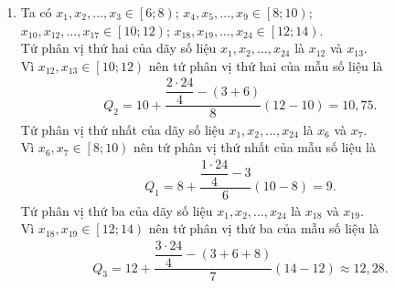 \begin{ex}
{\begin{enumerate}
\begin{longtable}{|*{5}{c|}}
				 \hline
			\end{longtable}
			 \item Ta có $x_1, x_2, \ldots, x_3 \in \left[6; 8\right)$; $x_4, x_5, \ldots, x_9 \in \left[8; 10\right)$; $x_{10}, x_{12}, \ldots, x_{17} \in \left[10; 12\right)$; $x_{18}, x_{19}, \ldots, x_{24} \in \left[12; 14\right)$.\\
			Tứ phân vị thứ hai của dãy số liệu $x_1, x_2, \ldots, x_{24}$ là $x_{12}$ và  $x_{13}$.\\
			Vì $x_{12}, x_{13} \in \left[10; 12\right)$  nên tứ phân vị thứ hai của mẫu số liệu là
			\begin{align*}
				 Q_2=10+\dfrac{\dfrac{2\cdot24}{4}-\left(3+6\right)}{8} \left(12-10\right)=10{,}75.
			\end{align*}
			Tứ phân vị thứ nhất của dãy số liệu $x_1, x_2, \ldots, x_{24}$  là $x_6$ và $x_7$. \\
			Vì $x_6, x_7 \in \left[8; 10\right)$ nên tứ phân vị thứ  nhất của mẫu số liệu là
			\begin{align*}
				Q_1=8+\dfrac{\dfrac{1\cdot24}{4}-3}{6}  \left(10-8\right)=9.
			\end{align*}
			Tứ phân vị thứ ba của dãy số liệu  $x_1, x_2, \ldots, x_{24}$ là $x_{18}$ và $x_{19}$.\\
			Vì $x_{18}, x_{19} \in \left[12; 14\right)$ nên tứ phân  vị thứ ba của mẫu số liệu là
			\begin{align*}
				 Q_3=12+\dfrac{\dfrac{3\cdot24}{4}-\left(3+6+8\right)}{7} \left(14-12\right)\approx 12{,}28.
			\end{align*}
		\end{enumerate}
	} 
\end{ex}


